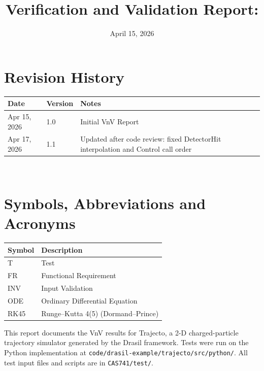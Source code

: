 \documentclass[12pt, titlepage]{article}
\begin{document}
\title{Verification and Validation Report: \progname}
\author{\authname}
\date{April 15, 2026}

\maketitle


\section{Revision History}

\begin{tabularx}{\textwidth}{p{3cm}p{2cm}X}
\toprule {\bf Date} & {\bf Version} & {\bf Notes}\\
\midrule
Apr 15, 2026 & 1.0 & Initial VnV Report\\
Apr 17, 2026 & 1.1 & Updated after code review: fixed DetectorHit interpolation and Control call order\\
\bottomrule
\end{tabularx}

~\newpage

\section{Symbols, Abbreviations and Acronyms}

\renewcommand{\arraystretch}{1.2}
\begin{tabular}{l l}
  \toprule
  \textbf{Symbol} & \textbf{Description}\\
  \midrule
  T    & Test\\
  FR   & Functional Requirement\\
  INV  & Input Validation\\
  ODE  & Ordinary Differential Equation\\
  RK45 & Runge--Kutta 4(5) (Dormand--Prince)\\
  \bottomrule
\end{tabular}

\newpage

\tableofcontents

\listoftables

\newpage


This report documents the VnV results for Trajecto, a 2-D
charged-particle trajectory simulator generated by the Drasil framework.
Tests were run on the Python implementation at
\texttt{code/drasil-example/trajecto/src/python/}.
All test input files and scripts are in \texttt{CAS741/test/}.
\end{document}
